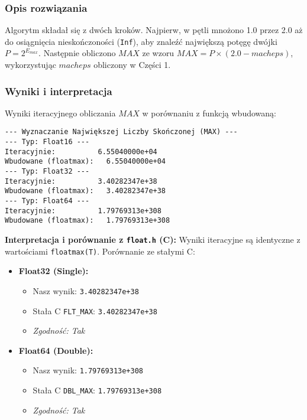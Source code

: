 \documentclass[12pt,a4paper]{article}
\begin{document}
\subsubsection{Opis rozwiązania}
Algorytm składał się z dwóch kroków. Najpierw, w pętli mnożono 1.0 przez 2.0 aż do osiągnięcia nieskończoności (\texttt{Inf}), aby znaleźć największą potęgę dwójki $P = 2^{E_{max}}$. Następnie obliczono $MAX$ ze wzoru $MAX = P \times (2.0 - macheps)$, wykorzystując $macheps$ obliczony w Części 1.

\subsubsection{Wyniki i interpretacja}
Wyniki iteracyjnego obliczania $MAX$ w porównaniu z funkcją wbudowaną:
\begin{verbatim}
--- Wyznaczanie Największej Liczby Skończonej (MAX) ---
--- Typ: Float16 ---
Iteracyjnie:          6.55040000e+04
Wbudowane (floatmax):   6.55040000e+04
--- Typ: Float32 ---
Iteracyjnie:          3.40282347e+38
Wbudowane (floatmax):   3.40282347e+38
--- Typ: Float64 ---
Iteracyjnie:          1.79769313e+308
Wbudowane (floatmax):   1.79769313e+308
\end{verbatim}

\noindent \textbf{Interpretacja i porównanie z \texttt{float.h} (C):}
Wyniki iteracyjne są identyczne z wartościami \texttt{floatmax(T)}. Porównanie ze stałymi C:

\begin{minipage}{\textwidth} %
\begin{itemize}
    \item \textbf{Float32 (Single):}
    \begin{itemize}
        \item Nasz wynik: \texttt{3.40282347e+38}
        \item Stała C \texttt{FLT\_MAX}: \texttt{3.40282347e+38}
        \item \textit{Zgodność: Tak}
    \end{itemize}
    \item \textbf{Float64 (Double):}
    \begin{itemize}
        \item Nasz wynik: \texttt{1.79769313e+308}
        \item Stała C \texttt{DBL\_MAX}: \texttt{1.79769313e+308}
        \item \textit{Zgodność: Tak}
    \end{itemize}
\end{itemize}
\end{minipage} %
\end{document}
